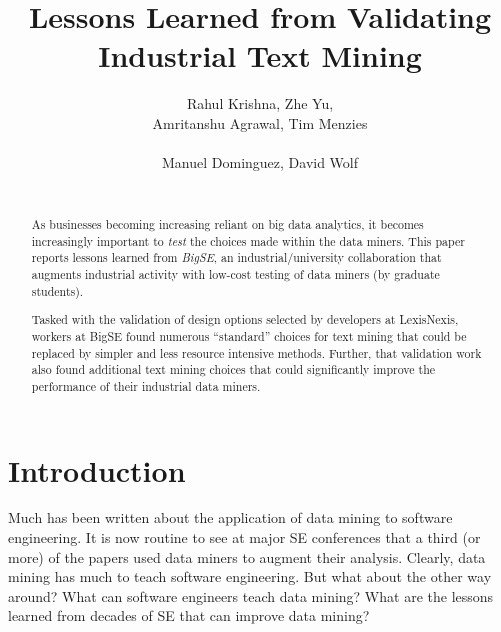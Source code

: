 \documentclass{sig-alternate-05-2015}
\begin{document}

\title{Lessons Learned from Validating  Industrial Text Mining  }
\author{
\alignauthor
Rahul Krishna,  Zhe Yu, \\ Amritanshu Agrawal, Tim Menzies\\ %
       \\
\alignauthor
Manuel Dominguez,  David Wolf \\%
       \\
}
\maketitle


\begin{abstract}

As businesses becoming increasing reliant on big data   analytics, it becomes
increasingly important to {\em test} the choices made within the data miners.
This paper reports   lessons learned from  {\em BigSE}, an industrial/university
collaboration that augments industrial activity with low-cost testing
of data miners (by  graduate students).  

Tasked with the validation of design options selected by developers at LexisNexis, workers
at BigSE found numerous ``standard'' choices for
text mining that could be replaced by  simpler and less resource intensive methods. Further, that validation work also found additional text mining choices   that could significantly improve the performance of their
industrial data miners.

\end{abstract}



\section{Introduction}
Much has been written about the application of data mining
to software engineering. It is now routine to see at major SE
conferences that a third (or more) of the papers used data miners
to augment their analysis.
Clearly, data mining has much to teach software engineering.
But what about the other way around? What can software engineers teach
data mining? What are the lessons learned from decades of SE that
can improve data mining?
\end{document}
